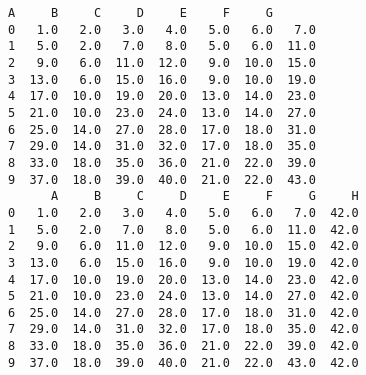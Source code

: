 \documentclass{article}
\begin{document}
    \begin{Verbatim}[commandchars=\\\{\}]
      A     B     C     D     E     F     G
0   1.0   2.0   3.0   4.0   5.0   6.0   7.0
1   5.0   2.0   7.0   8.0   5.0   6.0  11.0
2   9.0   6.0  11.0  12.0   9.0  10.0  15.0
3  13.0   6.0  15.0  16.0   9.0  10.0  19.0
4  17.0  10.0  19.0  20.0  13.0  14.0  23.0
5  21.0  10.0  23.0  24.0  13.0  14.0  27.0
6  25.0  14.0  27.0  28.0  17.0  18.0  31.0
7  29.0  14.0  31.0  32.0  17.0  18.0  35.0
8  33.0  18.0  35.0  36.0  21.0  22.0  39.0
9  37.0  18.0  39.0  40.0  21.0  22.0  43.0
      A     B     C     D     E     F     G     H
0   1.0   2.0   3.0   4.0   5.0   6.0   7.0  42.0
1   5.0   2.0   7.0   8.0   5.0   6.0  11.0  42.0
2   9.0   6.0  11.0  12.0   9.0  10.0  15.0  42.0
3  13.0   6.0  15.0  16.0   9.0  10.0  19.0  42.0
4  17.0  10.0  19.0  20.0  13.0  14.0  23.0  42.0
5  21.0  10.0  23.0  24.0  13.0  14.0  27.0  42.0
6  25.0  14.0  27.0  28.0  17.0  18.0  31.0  42.0
7  29.0  14.0  31.0  32.0  17.0  18.0  35.0  42.0
8  33.0  18.0  35.0  36.0  21.0  22.0  39.0  42.0
9  37.0  18.0  39.0  40.0  21.0  22.0  43.0  42.0

    \end{Verbatim}
\end{document}
